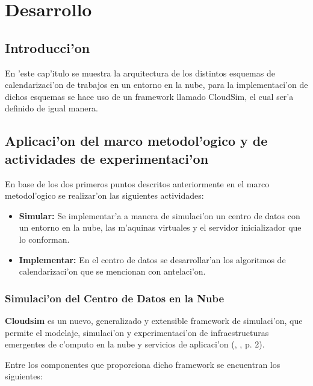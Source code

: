 \chapter{Desarrollo}
\section*{Introducci'on}

En 'este cap'itulo se muestra la arquitectura de los distintos esquemas de calendarizaci'on de trabajos en un entorno en la nube, para la implementaci'on de dichos esquemas se hace uso de un framework llamado CloudSim, el cual ser'a definido de igual manera.





\section{Aplicaci'on del marco metodol'ogico y de actividades de experimentaci'on}

En base de los dos primeros puntos descritos anteriormente en el marco metodol'ogico se realizar'on las siguientes actividades:

\begin{itemize}
	\item \textbf{Simular:} Se implementar'a a manera de simulaci'on un centro de datos con un entorno en la nube, las m'aquinas virtuales y el servidor inicializador que lo conforman.
	\item \textbf{Implementar:} En el centro de datos se desarrollar'an los algoritmos de calendarizaci'on que se mencionan con antelaci'on.
\end{itemize}

\subsection{Simulaci'on del Centro de Datos en la Nube}

 \textbf{Cloudsim} es un nuevo, generalizado y extensible framework de simulaci'on, que permite el modelaje, simulaci'on y experimentaci'on de infraestructuras emergentes de c'omputo en la nube y servicios de aplicaci'on (\citeauthor{calheiros2011cloudsim}, \citeyear{calheiros2011cloudsim}, p. 2).

Entre los componentes que proporciona dicho framework se encuentran los siguientes:

